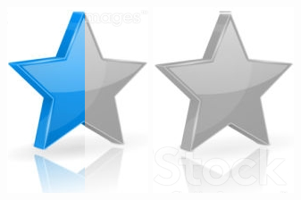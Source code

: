 \documentclass[10pt,a4paper,sans]{article}
\begin{document}
\begin{minipage}[t]{0.26\textwidth}
\begin{mdframed}[style=cadreCompetences]
\begin{itemize}
{                    \includegraphics[scale=0.20]{img/half_star.png} \hspace{-0.2cm}
                    \includegraphics[scale=0.20]{img/empty_star.png}}
            \end{itemize}

\end{mdframed}
\end{minipage}
\end{document}
